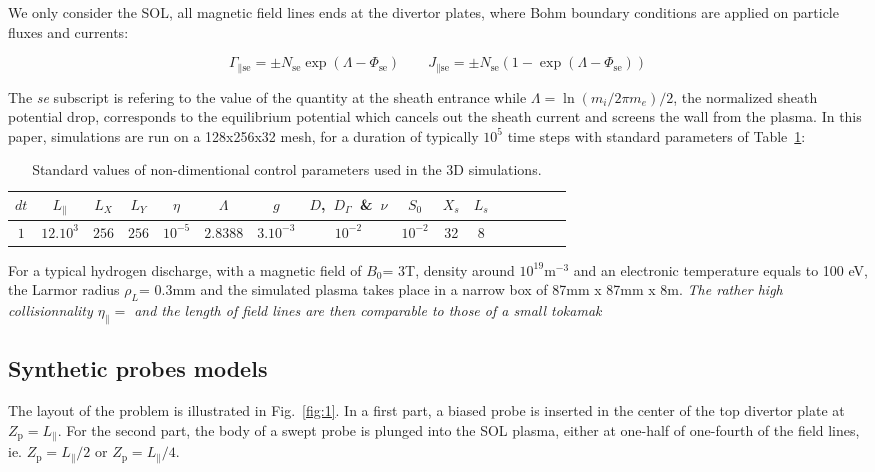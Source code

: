 \documentclass[cpp,a4paper,fleqn,twoside%
]{w-art}
\begin{document}
We only consider the SOL, all magnetic field lines ends at the divertor plates,
where Bohm boundary conditions are applied on particle fluxes and currents:

$$\Gamma_{\parallel\text{se}}=\pm
N_\text{se}\exp(\Lambda-\Phi_\text{se})
 \qquad
 J_{\parallel\text{se}} = \pm
 N_\text{se}(1-\exp(\Lambda-\Phi_\text{se}))
$$ 

The \emph{se} subscript is refering to the value of the quantity at the sheath
 entrance while $\Lambda=\ln(m_i/2\pi m_e)/2$, the normalized sheath potential
 drop, corresponds to the equilibrium potential which cancels out the sheath
 current and screens the wall from the plasma. In this paper,
 simulations are run on a 128x256x32 mesh, for a duration of typically $10^5$
 time steps with standard parameters of Table~\ref{tab:1}:

\begin{table}[h!]
\caption{Standard values of non-dimentional control parameters used in the 3D
simulations.}
\label{tab:1}
\begin{tabular}{@{}cccccccccccccccc@{}}
\toprule
$dt$&$L_\parallel$&$L_X$&$L_Y$&$\eta$ &$\Lambda$& $g$ &
$D$,~$D_\Gamma$~\&~$\nu$ & $S_0$ & $X_s$ & $L_s$\\
\hline
\addlinespace[0.4em]
$1$  &$12\text{.} 10^{3}$  & $256$&$256$ &$
10^{-5}$& $2.8388$&$3\text{.} 10^{-3}$& $10^{-2}$& $10^{-2}$ & 32 & 8 \\
\bottomrule
\end{tabular}
\end{table}

 For a typical
 hydrogen discharge, with a magnetic field of $B_0$= 3T, density around
 $10^{19}\text{m}^{-3}$ and an electronic temperature equals to 100 eV, the
 Larmor radius $\rho_L$= 0.3mm and the simulated plasma takes place in 
  a narrow box of 87mm x 87mm x 8m.
\emph{\color{red}The rather high collisionnality $\eta_\parallel=$ and the
length of field lines are then comparable to those of a small tokamak}

\subsection{\bf Synthetic probes models}

The layout of the problem is illustrated in Fig.~\ref{fig:1}. In a first part,
a biased probe is inserted in the center of the top divertor plate at
 $Z_\text{p}=L_\parallel$. For the second part, the body of a swept probe is
 plunged into the SOL plasma, either at one-half of one-fourth of the field
 lines, ie. $Z_\text{p}=L_\parallel/2$ or $Z_\text{p}=L_\parallel/4$.
 
\end{document}
